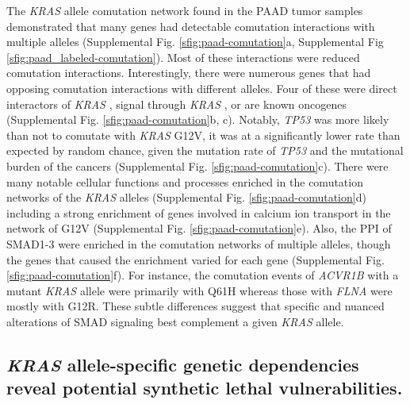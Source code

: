 \documentclass[english, 12pt, letterpaper]{article}
\newcommand{\KRAS}{\emph{KRAS}}
\begin{document}
The \KRAS{} allele comutation network found in the PAAD tumor samples demonstrated that many genes had detectable comutation interactions with multiple alleles (Supplemental Fig. \ref{sfig:paad-comutation}a, Supplemental Fig \ref{sfig:paad_labeled-comutation}).
Most of these interactions were reduced comutation interactions.
Interestingly, there were numerous genes that had opposing comutation interactions with different alleles.
Four of these were direct interactors of \KRAS{} \cite{Kovalski2019}, signal through \KRAS{} \cite{Kanehisa2017, Kanehisa2016KEGGAnnotation.}, or are known oncogenes \cite{Bamford2004TheWebsite., Sondka2018} (Supplemental Fig. \ref{sfig:paad-comutation}b, c).
Notably, \emph{TP53} was more likely than not to comutate with \KRAS{} G12V, it was at a significantly lower rate than expected by random chance, given the mutation rate of \emph{TP53} and the mutational burden of the cancers (Supplemental Fig. \ref{sfig:paad-comutation}c).
There were many notable cellular functions and processes enriched in the comutation networks of the \KRAS{} alleles (Supplemental Fig. \ref{sfig:paad-comutation}d) including a strong enrichment of genes involved in calcium ion transport in the network of G12V (Supplemental Fig. \ref{sfig:paad-comutation}e).
Also, the PPI of SMAD1-3 were enriched in the comutation networks of multiple alleles, though the genes that caused the enrichment varied for each gene (Supplemental Fig. \ref{sfig:paad-comutation}f).
For instance, the comutation events of \emph{ACVR1B} with a mutant \KRAS{} allele were primarily with Q61H whereas those with \emph{FLNA} were mostly with G12R.
These subtle differences suggest that specific and nuanced alterations of SMAD signaling best complement a given \KRAS{} allele.



\subsection*{\KRAS{} allele-specific genetic dependencies reveal potential synthetic lethal vulnerabilities.}
\end{document}
